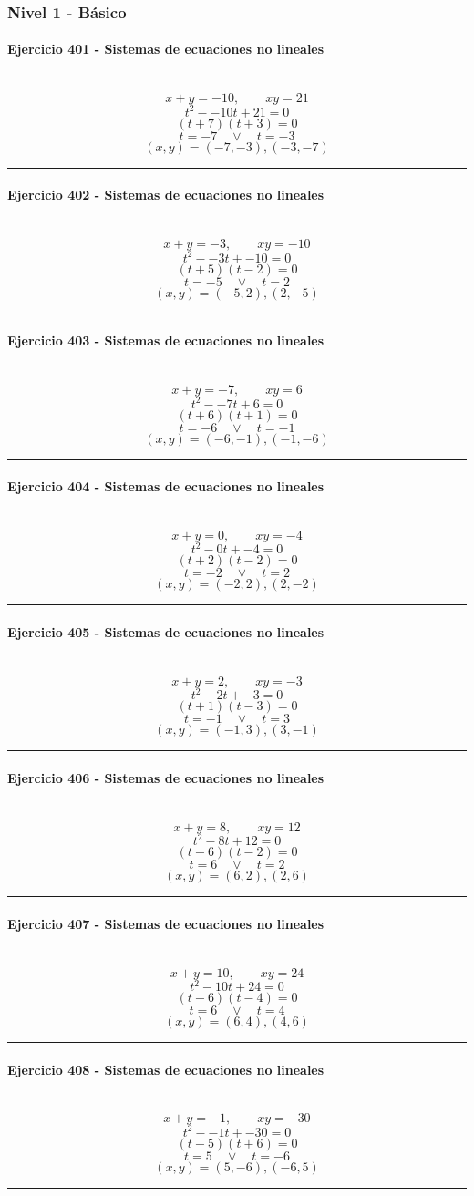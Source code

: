 \documentclass[10pt,a4paper]{article}
\newcommand{\res}[1]{\paragraph{#1}\mbox{}\\[-1.2em]}
\begin{document}
\subsubsection*{Nivel 1 - Básico}
\res{Ejercicio 401 - Sistemas de ecuaciones no lineales}
\[ x+y=-10,\qquad xy=21 \]
\[ t^2--10t+21=0 \]
\[ (t+7)(t+3)=0 \]
\[ t=-7\quad \vee \quad t=-3 \]
\[ \boxed{(x,y)=(-7,-3),(-3,-7)} \]
\vspace{1mm}\hrule\vspace{2mm}
\res{Ejercicio 402 - Sistemas de ecuaciones no lineales}
\[ x+y=-3,\qquad xy=-10 \]
\[ t^2--3t+-10=0 \]
\[ (t+5)(t-2)=0 \]
\[ t=-5\quad \vee \quad t=2 \]
\[ \boxed{(x,y)=(-5,2),(2,-5)} \]
\vspace{1mm}\hrule\vspace{2mm}
\res{Ejercicio 403 - Sistemas de ecuaciones no lineales}
\[ x+y=-7,\qquad xy=6 \]
\[ t^2--7t+6=0 \]
\[ (t+6)(t+1)=0 \]
\[ t=-6\quad \vee \quad t=-1 \]
\[ \boxed{(x,y)=(-6,-1),(-1,-6)} \]
\vspace{1mm}\hrule\vspace{2mm}
\res{Ejercicio 404 - Sistemas de ecuaciones no lineales}
\[ x+y=0,\qquad xy=-4 \]
\[ t^2-0t+-4=0 \]
\[ (t+2)(t-2)=0 \]
\[ t=-2\quad \vee \quad t=2 \]
\[ \boxed{(x,y)=(-2,2),(2,-2)} \]
\vspace{1mm}\hrule\vspace{2mm}
\res{Ejercicio 405 - Sistemas de ecuaciones no lineales}
\[ x+y=2,\qquad xy=-3 \]
\[ t^2-2t+-3=0 \]
\[ (t+1)(t-3)=0 \]
\[ t=-1\quad \vee \quad t=3 \]
\[ \boxed{(x,y)=(-1,3),(3,-1)} \]
\vspace{1mm}\hrule\vspace{2mm}
\res{Ejercicio 406 - Sistemas de ecuaciones no lineales}
\[ x+y=8,\qquad xy=12 \]
\[ t^2-8t+12=0 \]
\[ (t-6)(t-2)=0 \]
\[ t=6\quad \vee \quad t=2 \]
\[ \boxed{(x,y)=(6,2),(2,6)} \]
\vspace{1mm}\hrule\vspace{2mm}
\res{Ejercicio 407 - Sistemas de ecuaciones no lineales}
\[ x+y=10,\qquad xy=24 \]
\[ t^2-10t+24=0 \]
\[ (t-6)(t-4)=0 \]
\[ t=6\quad \vee \quad t=4 \]
\[ \boxed{(x,y)=(6,4),(4,6)} \]
\vspace{1mm}\hrule\vspace{2mm}
\res{Ejercicio 408 - Sistemas de ecuaciones no lineales}
\[ x+y=-1,\qquad xy=-30 \]
\[ t^2--1t+-30=0 \]
\[ (t-5)(t+6)=0 \]
\[ t=5\quad \vee \quad t=-6 \]
\[ \boxed{(x,y)=(5,-6),(-6,5)} \]
\vspace{1mm}\hrule\vspace{2mm}
\end{document}
